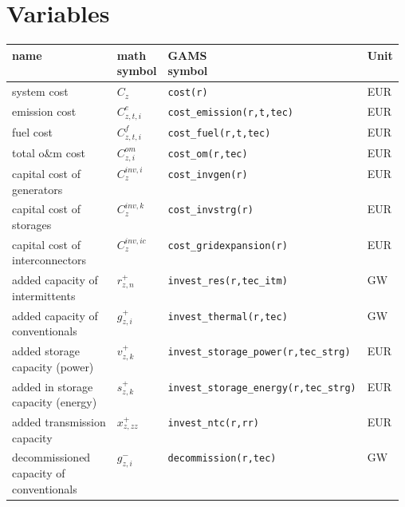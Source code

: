 \documentclass[11pt,a4paper]{article}
\begin{document}
\section{Variables} \label{variables}
\begin{tabular}{l l l l}
\textbf{name} & \makecell[l]{\textbf{math} \\ \textbf{symbol}} & \makecell[l]{\textbf{GAMS} \\\textbf{symbol}} & \textbf{Unit} \\
\hline \hline
system cost & $C_{z}$ & \texttt{cost(r)} & EUR \\ \hline
emission cost & $C^{e}_{z,t,i}$ & \texttt{cost\_emission(r,t,tec)} & EUR \\ \hline
fuel cost & $C^{f}_{z,t,i}$ & \texttt{cost\_fuel(r,t,tec)} & EUR \\ \hline
total o\&m cost & $C^{om}_{z,i}$ & \texttt{cost\_om(r,tec)} & EUR \\ \hline
\makecell[l]{capital cost of \\generators} & $C_{z}^{inv,i}$ & \texttt{cost\_invgen(r)} & EUR \\ \hline
\makecell[l]{capital cost of \\storages} & $C_{z}^{inv,k}$ & \texttt{cost\_invstrg(r)} & EUR \\ \hline
\makecell[l]{capital cost of \\interconnectors} & $C_{z}^{inv,ic}$ & \texttt{cost\_gridexpansion(r)} & EUR \\ \hline
\makecell[l]{added capacity of \\intermittents} & $r^{+}_{z,n}$ & \texttt{invest\_res(r,tec\_itm)} & GW \\ \hline
\makecell[l]{added capacity of \\conventionals} & $g^{+}_{z,i}$ & \texttt{invest\_thermal(r,tec)} & GW \\ \hline
\makecell[l]{added storage \\capacity (power)} & $v^{+}_{z,k}$ & \texttt{invest\_storage\_power(r,tec\_strg)} & EUR \\ \hline
\makecell[l]{added in storage \\capacity (energy)} & $s^{+}_{z,k}$ & \texttt{invest\_storage\_energy(r,tec\_strg)} & EUR \\ \hline
\makecell[l]{added transmission \\capacity} & $x^{+}_{z,zz}$ & \texttt{invest\_ntc(r,rr)} & EUR \\ \hline
\makecell[l]{decommissioned \\capacity of \\conventionals} & $g^{-}_{z,i}$ & \texttt{decommission(r,tec)} & GW \\ \hline

\end{tabular}
\end{document}
